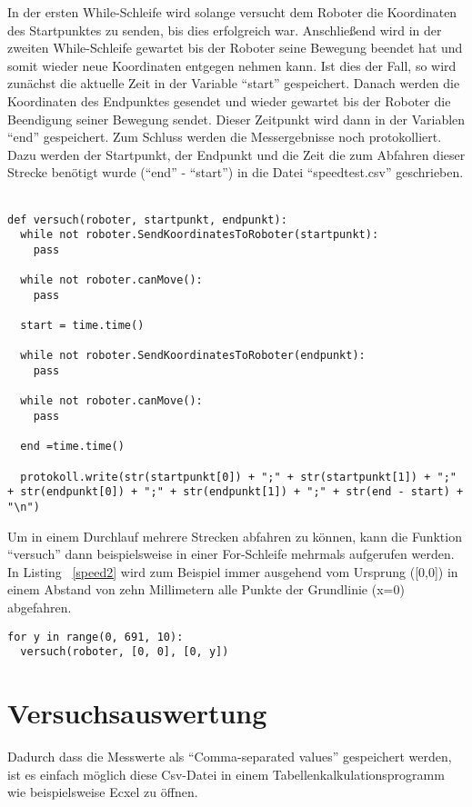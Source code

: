 In der ersten While-Schleife wird solange versucht dem Roboter die Koordinaten des Startpunktes zu senden, bis dies erfolgreich war. Anschließend wird in der zweiten While-Schleife gewartet bis der Roboter seine Bewegung beendet hat und somit wieder neue Koordinaten entgegen nehmen kann. Ist dies der Fall, so wird zunächst die aktuelle Zeit in der Variable \enquote{start} gespeichert. Danach werden die Koordinaten des Endpunktes gesendet und wieder gewartet bis der Roboter die Beendigung seiner Bewegung sendet. Dieser Zeitpunkt wird dann in der Variablen \enquote{end} gespeichert. Zum Schluss werden die Messergebnisse noch protokolliert. Dazu werden der Startpunkt, der Endpunkt und die Zeit die zum Abfahren dieser Strecke benötigt wurde (\enquote{end} - \enquote{start}) in die Datei \enquote{speedtest.csv} geschrieben.  
\\
\\
\begin{lstlisting}[caption= Python-Funktion für die Zeitmessung, label=speed1]
def versuch(roboter, startpunkt, endpunkt):
  while not roboter.SendKoordinatesToRoboter(startpunkt):
    pass

  while not roboter.canMove():
    pass
    
  start = time.time()
    
  while not roboter.SendKoordinatesToRoboter(endpunkt):
    pass  
     
  while not roboter.canMove():
    pass
    
  end =time.time()  

  protokoll.write(str(startpunkt[0]) + ";" + str(startpunkt[1]) + ";" + str(endpunkt[0]) + ";" + str(endpunkt[1]) + ";" + str(end - start) + "\n")
\end{lstlisting}

Um in einem Durchlauf mehrere Strecken abfahren zu können, kann die Funktion \enquote{versuch} dann beispielsweise in einer For-Schleife mehrmals aufgerufen werden. In Listing ~\ref{speed2} wird zum Beispiel immer ausgehend vom Ursprung ([0,0]) in einem Abstand von zehn Millimetern alle Punkte der Grundlinie (x=0) abgefahren.    
\\
\begin{lstlisting}[caption=Abfahren der Grundlinie, label=speed2]
for y in range(0, 691, 10):
  versuch(roboter, [0, 0], [0, y])
\end{lstlisting} 

\section{Versuchsauswertung}
Dadurch dass die Messwerte als \enquote{Comma-separated values} gespeichert werden, ist es einfach möglich diese Csv-Datei in einem Tabellenkalkulationsprogramm wie beispielsweise Ecxel zu öffnen. 

